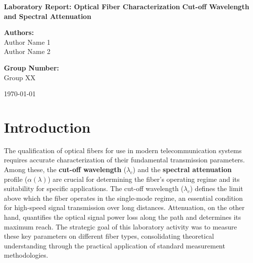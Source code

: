 \documentclass[a4paper,11pt]{article}
\theoremstyle{mythmstyle}
\begin{document}
\begin{titlepage}
    \centering
    \vspace*{2cm}
    
    {\Huge \textbf{Laboratory Report: Optical Fiber Characterization}}
    \vspace{0.5cm}
    {\Huge \textbf{Cut-off Wavelength and Spectral Attenuation}}
    
    \vspace{2cm}
    
    {\Large \textbf{Authors:}} \\
    \vspace{0.5cm}
    Author Name 1 \\
    Author Name 2 \\
    
    \vspace{1.5cm}
    
    {\Large \textbf{Group Number:}} \\
    \vspace{0.5cm}
    Group XX
    
    \vfill
    
    {\large \today}
    
    \vspace{2cm}
\end{titlepage}

\section{Introduction}

The qualification of optical fibers for use in modern telecommunication systems requires accurate characterization of their fundamental transmission parameters. Among these, the \textbf{cut-off wavelength} ($\lambda_c$) and the \textbf{spectral attenuation} profile ($\alpha(\lambda)$) are crucial for determining the fiber's operating regime and its suitability for specific applications. The cut-off wavelength ($\lambda_c$) defines the limit above which the fiber operates in the single-mode regime, an essential condition for high-speed signal transmission over long distances. Attenuation, on the other hand, quantifies the optical signal power loss along the path and determines its maximum reach. The strategic goal of this laboratory activity was to measure these key parameters on different fiber types, consolidating theoretical understanding through the practical application of standard measurement methodologies.
\end{document}
